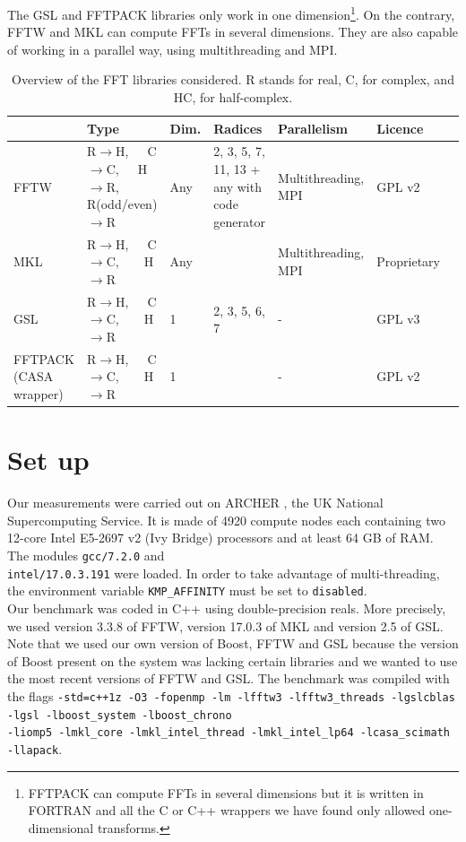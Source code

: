 \documentclass[12pt, a4paper]{article}
\begin{document}
The GSL and FFTPACK libraries only work in one dimension\footnote{FFTPACK can compute FFTs in several dimensions but it is written in FORTRAN and all the C or C++ wrappers we have found only allowed one-dimensional transforms.}. On the contrary, FFTW and MKL can compute FFTs in several dimensions. They are also capable of working in a parallel way, using multithreading and MPI.  
\begin{table}[H]  
\captionsetup{width=1\textwidth}
\begin{tabular}{|p{2.5cm}||p{2.5cm}|p{1cm}|p{3cm}|p{3cm}|p{2cm}|p{2cm}|}
\hline
& Type & Dim. & Radices & Parallelism & Licence \\
\hline
\hline
FFTW & R$\to$H,\ \ \  C$\to$C,\ \ \  H$\to$R, R{\scriptsize (odd/even)}$\to$R& Any&2, 3, 5, 7, 11, 13 + any with code generator & Multithreading, MPI & GPL v2\\
\hline
MKL  &  R$\to$H,\ \ \  C$\to$C,\ \ \ \  H$\to$R& Any & & Multithreading, MPI & Proprietary\\
\hline
GSL  &  R$\to$H,\ \ \  C$\to$C,\ \ \ \  H$\to$R & 1 & 2, 3, 5, 6, 7 & - & GPL v3\\
\hline
FFTPACK {\scriptsize (CASA wrapper)} &  R$\to$H,\ \ \  C$\to$C,\ \ \ \  H$\to$R & 1 & & - & GPL v2\\
\hline
\end{tabular}
\caption{Overview of the FFT libraries considered. R stands for real, C, for complex, and HC, for half-complex.}
\label{ffttable}
\end{table}

\section{Set up}
Our measurements were carried out on ARCHER \cite{archer}, the UK National Supercomputing Service. It is made of 4920 compute nodes each containing  two 12-core Intel E5-2697 v2 (Ivy Bridge) processors and at least 64 GB of RAM. The modules \texttt{gcc/7.2.0} and \\ \texttt{intel/17.0.3.191} were loaded. In order to take advantage of multi-threading, the environment variable \texttt{KMP\_AFFINITY} must be set to \texttt{disabled}.\\

Our benchmark was coded in C++ using double-precision reals. More precisely, we used version 3.3.8 of FFTW, version 17.0.3 of MKL and version 2.5 of GSL. Note that we used our own version of Boost, FFTW and GSL because the version of Boost present on the system was lacking certain libraries and we wanted to use the most recent versions of FFTW and GSL. The benchmark was compiled with the flags \texttt{-std=c++1z -O3  -fopenmp   -lm -lfftw3 -lfftw3\_threads -lgslcblas -lgsl -lboost\_system -lboost\_chrono\\-liomp5 -lmkl\_core -lmkl\_intel\_thread -lmkl\_intel\_lp64  -lcasa\_scimath \\-llapack}.\\
\end{document}

